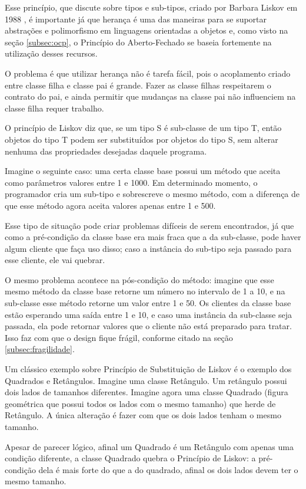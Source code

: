 Esse princípio, que discute sobre tipos e sub-tipos, criado por Barbara Liskov
em 1988 \cite{liskov}, é importante já que herança é uma das maneiras para se 
suportar abstrações e polimorfismo em linguagens orientadas a objetos e, como 
visto na seção \ref{subsec:ocp}, o Princípio do Aberto-Fechado se baseia 
fortemente na utilização desses recursos.

O problema é que utilizar herança não é tarefa fácil, pois o acoplamento criado
entre classe filha e classe pai é grande. Fazer as classe filhas respeitarem o
contrato do pai, e ainda permitir que mudanças na classe pai não influenciem na
classe filha requer trabalho.

O princípio de Liskov diz que, se um tipo S é sub-classe de um tipo T,
então objetos do tipo T podem ser substituídos por objetos do tipo S, sem
alterar nenhuma das propriedades desejadas daquele programa.

Imagine o seguinte caso: uma certa classe base possui um método que aceita como
parâmetros valores entre 1 e 1000. Em determinado momento, o programador cria um
sub-tipo e sobrescreve o mesmo método, com a diferença de que esse método agora 
aceita valores apenas entre 1 e 500. 

Esse tipo de situação pode criar problemas difíceis de serem encontrados, já que
como a pré-condição da classe base era mais fraca que a da sub-classe, pode
haver algum cliente que faça uso disso; caso a instância do sub-tipo seja
passado para esse cliente, ele vai quebrar. 

O mesmo problema acontece na pós-condição do método: imagine que esse mesmo
método da classe base retorne um número no intervalo de 1 a 10, e na sub-classe 
esse método retorne um valor entre 1 e 50. Os clientes da classe base estão 
esperando uma saída entre 1 e 10, e caso uma instância da sub-classe seja
passada, ela pode retornar valores que o cliente não está preparado para 
tratar. Isso faz com que o design fique frágil, conforme citado na  seção
\ref{subsec:fragilidade}.

Um clássico exemplo sobre Princípio de Substituição de Liskov é o exemplo  dos
Quadrados e Retângulos. Imagine uma classe Retângulo. Um retângulo possui dois 
lados de tamanhos diferentes. Imagine agora uma classe Quadrado (figura
geométrica que possui todos os lados com o mesmo tamanho) que herde de
Retângulo. A única alteração é fazer com que os dois lados tenham o mesmo 
tamanho. 

Apesar de parecer lógico, afinal um Quadrado é um Retângulo com apenas uma
condição diferente, a classe Quadrado quebra o Princípio de Liskov: a
pré-condição dela é mais forte do que a do quadrado, afinal os dois lados devem 
ter o mesmo tamanho.

